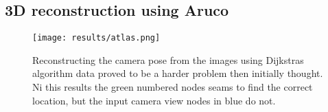 \subsection{3D reconstruction using Aruco}%
\label{sub:res:3drec}
\begin{figure}
\begin{center}
    \texttt{[image: results/atlas.png]}
\end{center}
\caption[Results from camera mapping]{Reconstructing the camera pose from the images using Dijkstras algorithm  data proved to be a harder problem then initially thought. Ni this results the green numbered nodes seams to find the correct location, but the input camera view nodes in blue do not.}
\label{fig:results:mapreconstruction}
\end{figure}


